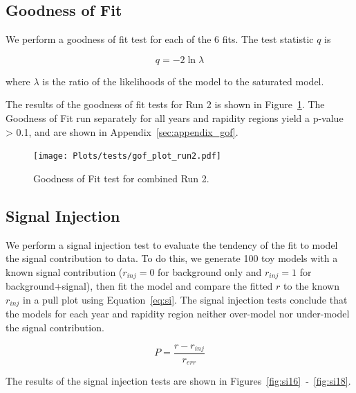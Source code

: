 \clearpage


\clearpage




\subsection{Goodness of Fit}
\label{sec:gof}


We perform a goodness of fit test for each of the 6 fits. The test statistic $q$ is 

$$ q = -2 \ln \lambda $$

where $\lambda$ is the ratio of the likelihoods of the model to the saturated model.

The results of the goodness of fit tests for Run 2 is shown in Figure~\ref{fig:gof_run2}. The Goodness of Fit run separately for all years and rapidity regions yield a p-value > 0.1, and are shown in Appendix~\ref{sec:appendix_gof}.

           
\begin{figure}[!htbp]
                \begin{center}
                 \texttt{[image: Plots/tests/gof\_plot\_run2.pdf]}

                    \caption{Goodness of Fit test for combined Run 2.}
                    \label{fig:gof_run2}
                \end{center}
            \end{figure}          
            
            
\subsection{Signal Injection}
\label{sec:siginj}

We perform a signal injection test to evaluate the tendency of the fit to model the signal contribution to data. To do this, we generate 100 toy models with a known signal contribution ($r_{inj} = 0$ for background only and $r_{inj} = 1$ for background+signal), then fit the model and compare the fitted $r$ to the known $r_{inj}$ in a pull plot using Equation~\ref{eq:si}. The signal injection tests conclude that the models for each year and rapidity region neither over-model nor under-model the signal contribution.

\begin{equation}
	P = \frac{r - r_{inj}}{r_{err}}
\label{eq:si}
\end{equation} 

The results of the signal injection tests are shown in Figures~\ref{fig:si16}~-~\ref{fig:si18}.


